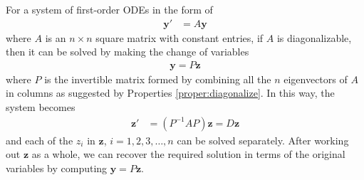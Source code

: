\begin{proper}
\label{proper:diagODE}
For a system of first-order ODEs in the form of 
\begin{align*}
\textbf{y}' &= A\textbf{y}
\end{align*}
where $A$ is an $n \times n$ square matrix with constant entries, if $A$ is diagonalizable, then it can be solved by making the change of variables
\begin{align*}
\textbf{y} = P\textbf{z}
\end{align*}
where $P$ is the invertible matrix formed by combining all the $n$ eigenvectors of $A$ in columns as suggested by Properties \ref{proper:diagonalize}. In this way, the system becomes
\begin{align*}
\textbf{z}' &= (P^{-1}AP)\textbf{z} = D\textbf{z}
\end{align*}
and each of the $z_i$ in $\textbf{z}$, $i= 1,2,3,\ldots,n$ can be solved separately. After working out $\textbf{z}$ as a whole, we can recover the required solution in terms of the original variables by computing $\textbf{y} = P\textbf{z}$.
\end{proper}

